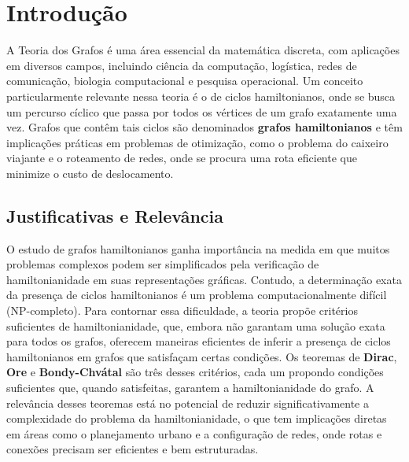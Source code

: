 \documentclass[12pt, openright, oneside, a4paper, chapter=TITLE, section=TITLE, subsection=TITLE, subsubsection=TITLE, brazil]{abntex2}
\begin{document}
\tableofcontents*


\chapter[Introdução]{Introdução}
A Teoria dos Grafos é uma área essencial da matemática discreta, com aplicações em diversos campos, incluindo ciência da computação, logística, redes de comunicação, biologia computacional e pesquisa operacional. Um conceito particularmente relevante nessa teoria é o de ciclos hamiltonianos, onde se busca um percurso cíclico que passa por todos os vértices de um grafo exatamente uma vez. Grafos que contêm tais ciclos são denominados \textbf{grafos hamiltonianos} e têm implicações práticas em problemas de otimização, como o problema do caixeiro viajante e o roteamento de redes, onde se procura uma rota eficiente que minimize o custo de deslocamento.

\section{Justificativas e Relevância}
O estudo de grafos hamiltonianos ganha importância na medida em que muitos problemas complexos podem ser simplificados pela verificação de hamiltonianidade em suas representações gráficas. Contudo, a determinação exata da presença de ciclos hamiltonianos é um problema computacionalmente difícil (NP-completo). Para contornar essa dificuldade, a teoria propõe critérios suficientes de hamiltonianidade, que, embora não garantam uma solução exata para todos os grafos, oferecem maneiras eficientes de inferir a presença de ciclos hamiltonianos em grafos que satisfaçam certas condições. Os teoremas de \textbf{Dirac}, \textbf{Ore} e \textbf{Bondy-Chvátal} são três desses critérios, cada um propondo condições suficientes que, quando satisfeitas, garantem a hamiltonianidade do grafo. A relevância desses teoremas está no potencial de reduzir significativamente a complexidade do problema da hamiltonianidade, o que tem implicações diretas em áreas como o planejamento urbano e a configuração de redes, onde rotas e conexões precisam ser eficientes e bem estruturadas.
\end{document}
